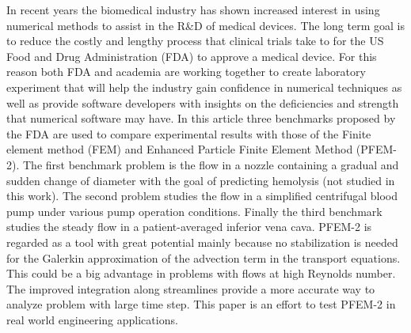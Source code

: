 In recent years the biomedical industry has shown increased interest in using numerical methods to assist in the R\&D of medical devices. The long term goal is to reduce the costly and lengthy process that clinical trials take to for the US Food and Drug Administration (FDA) to approve a medical device. For this reason both FDA and academia are working together to create laboratory experiment that will help the industry gain confidence in numerical techniques as well as provide software developers with insights on the deficiencies and strength that numerical software may have. In this article three benchmarks proposed by the FDA are used to compare experimental results with those of the Finite element method (FEM) and Enhanced Particle Finite Element Method (PFEM-2). The first benchmark problem is the flow in a nozzle
containing a gradual and sudden change of diameter with the goal of predicting hemolysis (not studied in this work). The second problem studies the flow in a simplified centrifugal
blood pump under various pump operation conditions. Finally the third benchmark studies the steady flow in a patient-averaged inferior vena cava. PFEM-2 is regarded as a tool with great potential mainly because no stabilization is needed for the Galerkin approximation of the advection term in the transport equations. This could be a big advantage in problems with flows at high Reynolds number. The improved integration along streamlines provide a more accurate way to analyze problem with large time step. This paper is an effort to test PFEM-2 in real world engineering applications.
